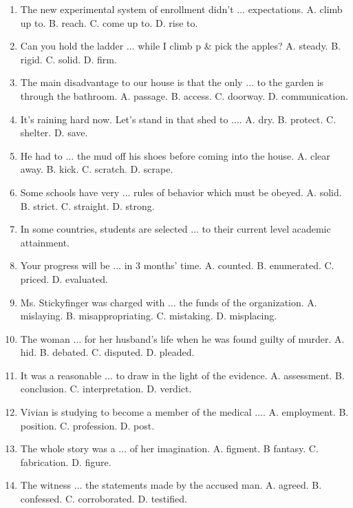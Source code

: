 \documentclass{article}
\numberwithin{equation}{section}
\begin{document}
\begin{enumerate}[leftmargin=8mm]
	\item The new experimental system of enrollment didn't $\ldots$ expectations. {\sf A.} climb up to. {\sf B.} reach. {\sf C.} come up to. {\sf D.} rise to.
	\item Can you hold the ladder $\ldots$ while I climb p \& pick the apples? {\sf A.} steady. {\sf B.} rigid. {\sf C.} solid. {\sf D.} firm.
	\item The main disadvantage to our house is that the only $\ldots$ to the garden is through the bathroom. {\sf A.} passage. {\sf B.} access. {\sf C.} doorway. {\sf D.} communication.
	\item It's raining hard now. Let's stand in that shed to $\ldots$. {\sf A.} dry. {\sf B.} protect. {\sf C.} shelter. {\sf D.} save.
	\item He had to $\ldots$ the mud off his shoes before coming into the house. {\sf A.} clear away. {\sf B.} kick. {\sf C.} scratch. {\sf D.} scrape.
	\item Some schools have very $\ldots$ rules of behavior which must be obeyed. {\sf A.} solid. {\sf B.} strict. {\sf C.} straight. {\sf D.} strong.
	\item In some countries, students are selected $\ldots$ to their current level academic attainment.
	\item Your progress will be $\ldots$ in 3 months' time. {\sf A.} counted. {\sf B.} enumerated. {\sf C.} priced. {\sf D.} evaluated.
	\item Ms. Stickyfinger was charged with $\ldots$ the funds of the organization. {\sf A.} mislaying. {\sf B.} misappropriating. {\sf C.} mistaking. {\sf D.} misplacing.
	\item The woman $\ldots$ for her husband's life when he was found guilty of murder. {\sf A.} hid. {\sf B.} debated. {\sf C.} disputed. {\sf D.} pleaded.
	\item It was a reasonable $\ldots$ to draw in the light of the evidence. {\sf A.} assessment. {\sf B.} conclusion. {\sf C.} interpretation. {\sf D.} verdict.
	\item Vivian is studying to become a member of the medical $\ldots$. {\sf A.} employment. {\sf B.} position. {\sf C.} profession. {\sf D.} post.
	\item The whole story was a $\ldots$ of her imagination. {\sf A.} figment. B fantasy. {\sf C.} fabrication. {\sf D.} figure.
	\item The witness $\ldots$ the statements made by the accused man. {\sf A.} agreed. {\sf B.} confessed. {\sf C.} corroborated. {\sf D.} testified.

\end{enumerate}
\end{document}
